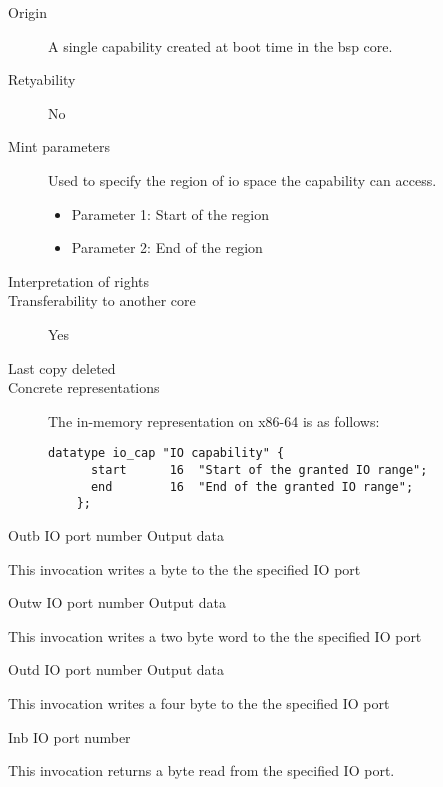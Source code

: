 \begin{description}
\item[Origin] A single capability created at boot time in the bsp core.
  
\item[Retyability] No
  
\item[Mint parameters] Used to specify the region of io space the capability can access.
  \begin{itemize}
  \item Parameter 1: Start of the region
  \item Parameter 2: End of the region
  \end{itemize}
  
\item[Interpretation of rights] 
  
\item[Transferability to another core] Yes

\item[Last copy deleted] 
  
\item[Concrete representations] The in-memory representation on x86-64 is as follows:
  
  \begin{lstlisting}[language=Mackerel]
    datatype io_cap "IO capability" {
      start      16  "Start of the granted IO range";
      end        16  "End of the granted IO range";
    };
  \end{lstlisting}
\end{description}

\begin{invocation}{Outb}
  \arg IO port number
  \arg Output data
\end{invocation}
This invocation writes a byte to the the specified IO port

\begin{invocation}{Outw}
  \arg IO port number
  \arg Output data
\end{invocation}
This invocation writes a two byte word to the the specified IO port

\begin{invocation}{Outd}
  \arg IO port number
  \arg Output data
\end{invocation}
This invocation writes a four byte to the the specified IO port

\begin{invocation}{Inb}
  \arg IO port number
\end{invocation}
This invocation returns a byte read from the specified IO port.

